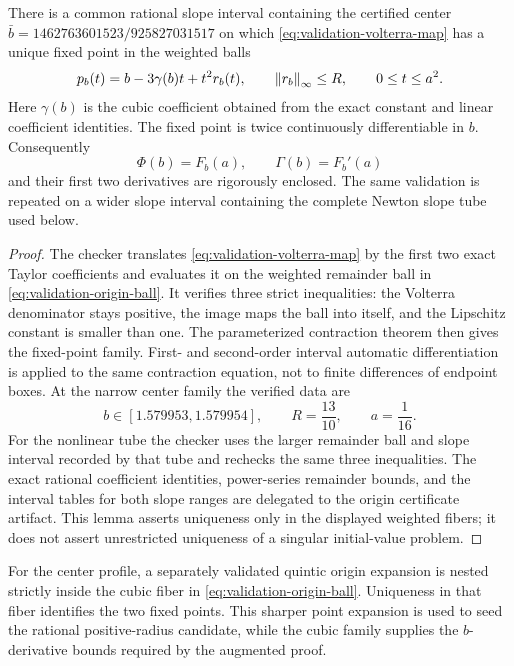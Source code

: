 \begin{lemma}
\label{lem:validation-origin-volterra}
There is a common rational slope interval containing the certified center
\(
 \bar b=1462763601523/925827031517
\)
on which \eqref{eq:validation-volterra-map} has a unique fixed point in the
weighted balls
\begin{equation}
 p_b(t)=b-3\gamma(b)t+t^2r_b(t),
 \qquad \left\lVert r_b\right\rVert_{\infty}\leq R,\qquad 0\leq t\leq a^2.
 \label{eq:validation-origin-ball}
\end{equation}
Here $\gamma(b)$ is the cubic coefficient obtained from the exact constant and
linear coefficient identities.  The fixed point is twice continuously
differentiable in $b$.  Consequently
\[
 \Phi(b)=F_b(a),\qquad \Gamma(b)=F_b'(a)
\]
and their first two derivatives are rigorously enclosed.  The same validation
is repeated on a wider slope interval containing the complete Newton slope
tube used below.
\end{lemma}

\begin{proof}
The checker translates \eqref{eq:validation-volterra-map} by the first two
exact Taylor coefficients and evaluates it on the weighted remainder ball in
\eqref{eq:validation-origin-ball}.  It verifies three strict inequalities: the
Volterra denominator stays positive, the image maps the ball into itself, and
the Lipschitz constant is smaller than one.  The parameterized contraction
theorem then gives the fixed-point family.  First- and second-order interval
automatic differentiation is applied to the same contraction equation, not
to finite differences of endpoint boxes.  At the narrow center family the
verified data are
\[
 b\in[1.579953,1.579954],\qquad R=\frac{13}{10},
 \qquad a=\frac1{16}.
\]
For the nonlinear tube the checker uses the larger remainder ball and slope
interval recorded by that tube and rechecks the same three inequalities.
The exact rational coefficient identities, power-series remainder bounds,
and the interval tables for both slope ranges are delegated to the origin
certificate artifact.  This lemma asserts uniqueness only in the displayed
weighted fibers; it does not assert unrestricted uniqueness of a singular
initial-value problem.
\end{proof}

For the center profile, a separately validated quintic origin expansion is
nested strictly inside the cubic fiber in
\eqref{eq:validation-origin-ball}.  Uniqueness in that fiber identifies the
two fixed points.  This sharper point expansion is used to seed the rational
positive-radius candidate, while the cubic family supplies the $b$-derivative
bounds required by the augmented proof.

